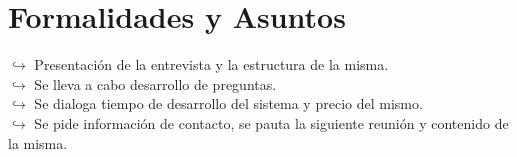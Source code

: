 \documentclass[a4paper,10pt]{article}
\begin{document}
\section{Formalidades y Asuntos}
$\hookrightarrow{}$ Presentación de la entrevista y la estructura de la misma. \\
$\hookrightarrow{}$ Se lleva a cabo desarrollo de preguntas. \\
$\hookrightarrow{}$ Se dialoga tiempo de desarrollo del sistema y precio del mismo. \\
$\hookrightarrow{}$ Se pide información de contacto, se pauta la siguiente reunión y contenido de la misma. \\
\end{document}

